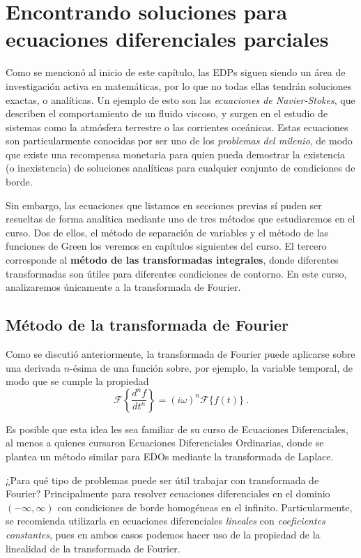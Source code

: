 \section{Encontrando soluciones para ecuaciones diferenciales parciales}

Como se mencionó al inicio de este capítulo, las EDPs siguen siendo un área de investigación activa en matemáticas, por lo que no todas ellas tendrán soluciones exactas, o analíticas. Un ejemplo de esto son las \emph{ecuaciones de Navier-Stokes}, que describen el comportamiento de un fluido viscoso, y surgen en el estudio de sistemas como la atmósfera terrestre o las corrientes oceánicas. Estas ecuaciones son particularmente conocidas por ser uno de los \emph{problemas del milenio}, de modo que existe una recompensa monetaria para quien pueda demostrar la existencia (o inexistencia) de soluciones analíticas para cualquier conjunto de condiciones de borde.

Sin embargo, las ecuaciones que listamos en secciones previas sí puden ser resueltas de forma analítica mediante uno de tres métodos que estudiaremos en el curso. Dos de ellos, el método de separación de variables y el método de las funciones de Green los veremos en capítulos siguientes del curso. El tercero corresponde al \textbf{método de las transformadas integrales}, donde diferentes transformadas son útiles para diferentes condiciones de contorno. En este curso, analizaremos únicamente a la transformada de Fourier.

\subsection{Método de la transformada de Fourier}

Como se discutió anteriormente, la transformada de Fourier puede aplicarse sobre una derivada $n$-ésima de una función sobre, por ejemplo, la variable temporal, de modo que se cumple la propiedad
\begin{equation}
\mathcal{F}\left\{ \frac{d^n f}{dt^n} \right\} = (i\omega)^n \mathcal{F}\{f(t)\} \ .
\end{equation}

Es posible que esta idea les sea familiar de su curso de Ecuaciones Diferenciales, al menos a quienes cursaron Ecuaciones Diferenciales Ordinarias, donde se plantea un método similar para EDOs mediante la transformada de Laplace.

¿Para qué tipo de problemas puede ser útil trabajar con transformada de Fourier? Principalmente para resolver ecuaciones diferenciales en el dominio $(-\infty, \infty)$ con condiciones de borde homogéneas en el infinito. Particularmente, se recomienda utilizarla en ecuaciones diferenciales \emph{lineales} con \emph{coeficientes constantes}, pues en ambos casos podemos hacer uso de la propiedad de la linealidad de la transformada de Fourier.

